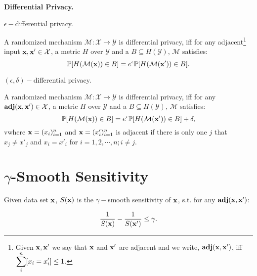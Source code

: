 \documentclass{article}
\begin{document}
\noindent \textbf{Differential Privacy.} 
\begin{definition}
\label{def_epsilon_dp}
$\epsilon-$differential privacy.

A randomized mechanism $\mathcal{M}: \mathcal{X} \rightarrow \mathcal{Y}$ is differential privacy, iff for any adjacent\footnote{Given $\textbf{x}, \textbf{x}'$  we say that $\textbf{x}$ and $\textbf{x}'$ are adjacent and we write, $\textbf{adj}(\textbf{x},\textbf{x}')$, iff\\
$\displaystyle \sum_{i}^{n}[x_i = x'_i ]\leq 1$. } input $\textbf{x}, \textbf{x}' \in \mathcal{X}$, a metric $H$ over $\mathcal{Y}$ and a $B \subseteq H(\mathcal{Y})$, $\mathcal{M}$ satisfies:
\begin{equation*}
\mathbb{P}[H(\mathcal{M}(\textbf{x})) \in B] = e^\epsilon \mathbb{P}[H(\mathcal{M}(\textbf{x}')) \in B].
\end{equation*}

\end{definition}

\begin{definition}
\label{def_epsilon_delta_dp}
$(\epsilon,\delta)-$differential privacy.

A randomized mechanism $\mathcal{M}: \mathcal{X} \rightarrow \mathcal{Y}$ is differential privacy, iff for any $\textbf{adj}(\textbf{x},\textbf{x}') \in \mathcal{X}$, a metric $H$ over $\mathcal{Y}$ and a $B \subseteq H(\mathcal{Y})$, $\mathcal{M}$ satisfies:
\begin{equation*}
\mathbb{P}[H(\mathcal{M}(\textbf{x})) \in B] = e^\epsilon \mathbb{P}[H(\mathcal{M}(\textbf{x}')) \in B] + \delta,
\end{equation*}
vwhere $\textbf{x} = (x_i)_{i = 1}^n$ and $\textbf{x} = (x'_i)_{i = 1}^n$ is adjacent if there is only one $j$ that $x_j \neq x'_j$ and $x_i = x'_i$ for $i = 1, 2, \cdots, n; i \neq j$. 
\end{definition}



\section{$\gamma$-Smooth Sensitivity}
\label{sec_mechs}

\begin{definition}
Given data set $\textbf{x}$, $S(\textbf{x})$ is the $\gamma -$smooth sensitivity of $\textbf{x}$, s.t. for any $\textbf{adj}(\textbf{x},\textbf{x}')$:

\begin{equation}
\label{eq_gamma_smooth}
\frac{1}{S(\textbf{x})} - \frac{1}{S(\textbf{x}')} \leq \gamma.
\end{equation}
\end{definition}
\end{document}
